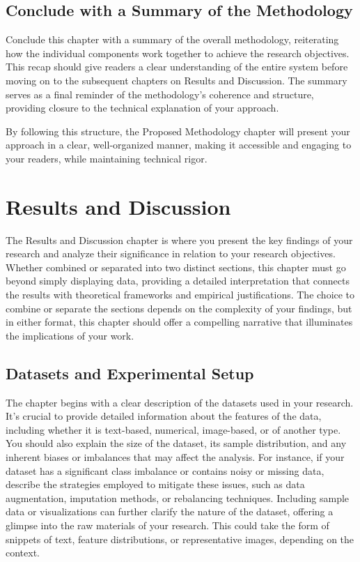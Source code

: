 \documentclass{iutbscthesis}
\begin{document}
\section{Conclude with a Summary of the Methodology}

Conclude this chapter with a summary of the overall methodology, reiterating how the individual components work together to achieve the research objectives. This recap should give readers a clear understanding of the entire system before moving on to the subsequent chapters on Results and Discussion. The summary serves as a final reminder of the methodology's coherence and structure, providing closure to the technical explanation of your approach.

By following this structure, the Proposed Methodology chapter will present your approach in a clear, well-organized manner, making it accessible and engaging to your readers, while maintaining technical rigor.


\chapter{Results and Discussion}
The Results and Discussion chapter is where you present the key findings of your research and analyze their significance in relation to your research objectives. Whether combined or separated into two distinct sections, this chapter must go beyond simply displaying data, providing a detailed interpretation that connects the results with theoretical frameworks and empirical justifications. The choice to combine or separate the sections depends on the complexity of your findings, but in either format, this chapter should offer a compelling narrative that illuminates the implications of your work.

\section{Datasets and Experimental Setup}

The chapter begins with a clear description of the datasets used in your research. It's crucial to provide detailed information about the features of the data, including whether it is text-based, numerical, image-based, or of another type. You should also explain the size of the dataset, its sample distribution, and any inherent biases or imbalances that may affect the analysis. For instance, if your dataset has a significant class imbalance or contains noisy or missing data, describe the strategies employed to mitigate these issues, such as data augmentation, imputation methods, or rebalancing techniques. Including sample data or visualizations can further clarify the nature of the dataset, offering a glimpse into the raw materials of your research. This could take the form of snippets of text, feature distributions, or representative images, depending on the context.
\end{document}
